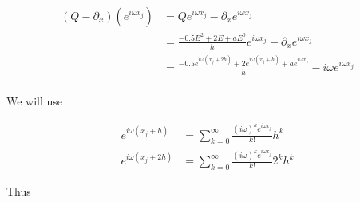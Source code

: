 \documentclass[11pt]{amsart}
\numberwithin{equation}{section}
\begin{document}
{\color{blue}

\begin{align}
    (Q - \partial_x)(e^{i\omega x_j}) & = Q e^{i\omega x_j} - \partial_x e^{i\omega x_j}                                                                  \\
                                      & = \frac{-0.5 E^2 + 2E + aE^0}{h} e^{i\omega x_j} - \partial_x e^{i\omega x_j}                                     \\
                                      & = \frac{-0.5 e^{i \omega (x_j + 2h)} + 2 e^{i \omega (x_j + h)} + ae^{i \omega x_j}}{h} - i\omega e^{i\omega x_j} \\
\end{align}

We will use

\begin{align}
    e^{i\omega (x_j + h)}  & = \sum_{k=0}^\infty \frac{(i\omega)^k e^{i\omega x_j}}{k!} h^k       \\ 
    e^{i\omega (x_j + 2h)} & = \sum_{k=0} ^\infty \frac{(i\omega)^k e^{i\omega x_j}}{k!} 2^k h^k 
\end{align}

Thus

}
\end{document}
